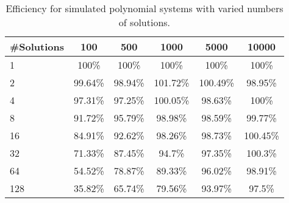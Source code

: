 \begin{table}[h]
\centering
\begin{tabular}{l||c|c|c|c|c|}
\#Solutions & 100 & 500 & 1000 & 5000 & 10000\\ \hline
1 & 100\% & 100\% & 100\% & 100\% & 100\%\\
2 & 99.64\% & 98.94\% & 101.72\% & 100.49\% & 98.95\%\\
4 & 97.31\% & 97.25\% & 100.05\% & 98.63\% & 100\%\\
8 & 91.72\% & 95.79\% & 98.98\% & 98.59\% & 99.77\%\\
16 & 84.91\% & 92.62\% & 98.26\% & 98.73\% & 100.45\%\\
32 & 71.33\% & 87.45\% & 94.7\% & 97.35\% & 100.3\%\\
64 & 54.52\% & 78.87\% & 89.33\% & 96.02\% & 98.91\%\\
128 & 35.82\% & 65.74\% & 79.56\% & 93.97\% & 97.5\%\\
\end{tabular}
\caption{Efficiency for simulated polynomial systems with varied numbers of solutions.}
\label{FakeParallelEfficiency}
\end{table}